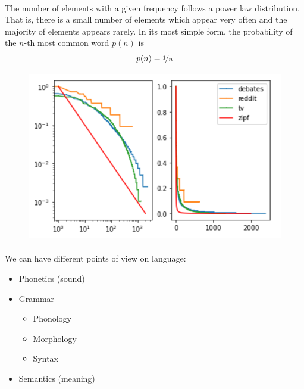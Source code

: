 \documentclass[10pt,twocolumn]{article}
\begin{document}
\paragraph{} The number of elements with a given frequency
follows a power law distribution. That is, there is a small number of elements
which appear very often and the majority of elements appears rarely. In its most
simple form, the probability of the $n$-th most common word $p(n)$ is
\begin{align*}
  p(n) = \nicefrac{1}{n}
\end{align*}
\begin{figure}[h]
  \centering
  \includegraphics[width=0.8\linewidth]{zipf.png}
\end{figure}

\paragraph{} We can have different points of view on
language:
\begin{itemize}
\item Phonetics (sound)
\item Grammar
\begin{itemize}
\item Phonology
\item Morphology
\item Syntax
\end{itemize}
\item Semantics (meaning)
\end{itemize}
\end{document}
